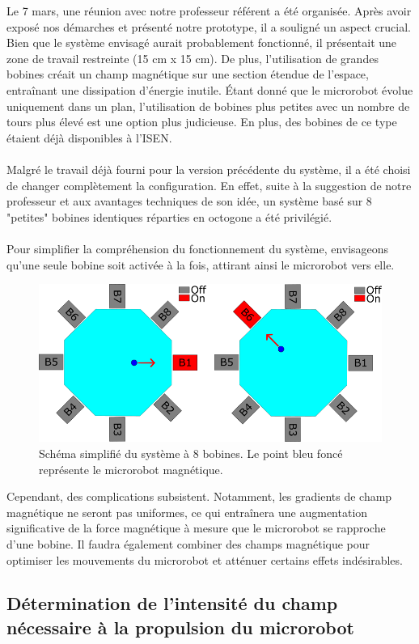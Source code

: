 \documentclass{article}
\begin{document}
Le 7 mars, une réunion avec notre professeur référent a été organisée. Après avoir exposé nos démarches et présenté notre prototype, il a souligné un aspect crucial. Bien que le système envisagé aurait probablement fonctionné, il présentait une zone de travail restreinte (15 cm x 15 cm). De plus, l'utilisation de grandes bobines créait un champ magnétique sur une section étendue de l'espace, entraînant une dissipation d'énergie inutile. Étant donné que le microrobot évolue uniquement dans un plan, l'utilisation de bobines plus petites avec un nombre de tours plus élevé est une option plus judicieuse. En plus, des bobines de ce type étaient déjà disponibles à l'ISEN.
\\
\\
Malgré le travail déjà fourni pour la version précédente du système, il a été choisi de changer complètement la configuration. En effet, suite à la suggestion de notre professeur et aux avantages techniques de son idée, un système basé sur 8 "petites" bobines identiques réparties en octogone a été privilégié.
\\
\\
Pour simplifier la compréhension du fonctionnement du système, envisageons qu'une seule bobine soit activée à la fois, attirant ainsi le microrobot vers elle. 
\begin{figure}[H]
    \centering
    \includegraphics[width=0.5\linewidth]{Images/Explication_simple.png}
    \caption{Schéma simplifié du système à 8 bobines. Le point bleu foncé représente le microrobot magnétique.}
    \label{fig:Schéma_simplifié}
\end{figure}
\noindent
Cependant, des complications subsistent. Notamment, les gradients de champ magnétique ne seront pas uniformes, ce qui entraînera une augmentation significative de la force magnétique à mesure que le microrobot se rapproche d'une bobine. Il faudra également combiner des champs magnétique pour optimiser les mouvements du microrobot et atténuer certains effets indésirables.

\subsection{Détermination de l'intensité du champ nécessaire à la propulsion du microrobot}
\end{document}
